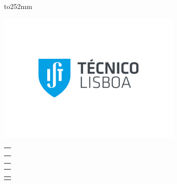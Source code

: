 %

\pagestyle{empty}

\enlargethispage{252mm minus \textheight}
\vbox to252mm {
%
%
\vspace*{-46.5mm}
\hspace*{-30.5mm}\includegraphics[width=90mm]{images/Logo_IST.pdf} %

\vspace*{-2cm}

%
%
\hspace*{-10.5mm}
\begin{tabular}{p{155.5mm}}
\centering{\sffamily\bfseries\huge UNIVERSIDADE DE LISBOA}\\
\centering{\sffamily\bfseries\huge INSTITUTO SUPERIOR T\'{E}CNICO}\\
\smallskip
\end{tabular}

\vspace*{5mm} %

%
%
\hspace*{-10.5mm}
\begin{tabular}{p{155.5mm}}
\centering{\sffamily\bfseries\LARGE Big Data Privacy by Design Computation Platform}\\
\smallskip
\end{tabular}

\vspace*{5mm}

%
%
\hspace*{-10.5mm}
\begin{tabular}{p{155.5mm}}
\centering{\sffamily\bfseries\Large Rui Nuno Lopes Claro}\\
\end{tabular}

}
